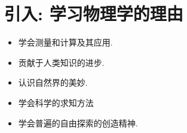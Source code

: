 
\section{引入: 学习物理学的理由}
\begin{itemize}
    \item 学会测量和计算及其应用.
    \item 贡献于人类知识的进步.
    \item 认识自然界的美妙.
    \item 学会科学的求知方法
    \item 学会普遍的自由探索的创造精神.
\end{itemize}
